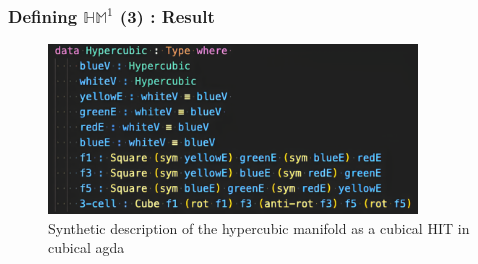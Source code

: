 \documentclass{beamer}
\begin{document}
    \begin{frame}
        \frametitle{Defining $\mathbb{HM}^1$ (3) : Result}
        \begin{figure}[h]
            \begin{center}
              \includegraphics[height= 4.5cm]{images/Agda - VH.png}
              \caption{Synthetic description of the hypercubic manifold as a cubical HIT in cubical agda}
            \end{center}
          \end{figure}
    \end{frame}
\end{document}
